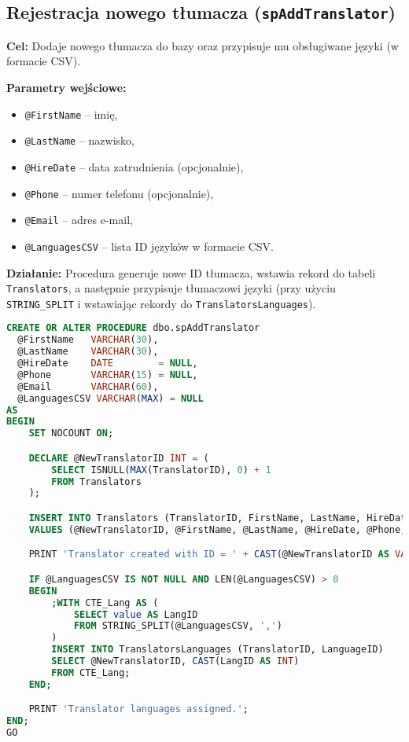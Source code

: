 \documentclass[12pt]{article}
\begin{document}
\newpage
\subsection{Rejestracja nowego tłumacza (\texttt{spAddTranslator})}
\textbf{Cel:} Dodaje nowego tłumacza do bazy oraz przypisuje mu obsługiwane języki (w formacie CSV).

\textbf{Parametry wejściowe:}
\begin{itemize}
  \item \verb|@FirstName| – imię,
  \item \verb|@LastName| – nazwisko,
  \item \verb|@HireDate| – data zatrudnienia (opcjonalnie),
  \item \verb|@Phone| – numer telefonu (opcjonalnie),
  \item \verb|@Email| – adres e-mail,
  \item \verb|@LanguagesCSV| – lista ID języków w formacie CSV.
\end{itemize}

\textbf{Działanie:} Procedura generuje nowe ID tłumacza, wstawia rekord do tabeli \verb|Translators|, a następnie przypisuje tłumaczowi języki (przy użyciu \verb|STRING_SPLIT| i wstawiając rekordy do \verb|TranslatorsLanguages|).

\begin{lstlisting}[language=SQL]
CREATE OR ALTER PROCEDURE dbo.spAddTranslator
  @FirstName   VARCHAR(30),
  @LastName    VARCHAR(30),
  @HireDate    DATE        = NULL,
  @Phone       VARCHAR(15) = NULL,
  @Email       VARCHAR(60),
  @LanguagesCSV VARCHAR(MAX) = NULL
AS
BEGIN
    SET NOCOUNT ON;

    DECLARE @NewTranslatorID INT = (
        SELECT ISNULL(MAX(TranslatorID), 0) + 1
        FROM Translators
    );

    INSERT INTO Translators (TranslatorID, FirstName, LastName, HireDate, Phone, Email)
    VALUES (@NewTranslatorID, @FirstName, @LastName, @HireDate, @Phone, @Email);

    PRINT 'Translator created with ID = ' + CAST(@NewTranslatorID AS VARCHAR(10));

    IF @LanguagesCSV IS NOT NULL AND LEN(@LanguagesCSV) > 0
    BEGIN
        ;WITH CTE_Lang AS (
            SELECT value AS LangID
            FROM STRING_SPLIT(@LanguagesCSV, ',')
        )
        INSERT INTO TranslatorsLanguages (TranslatorID, LanguageID)
        SELECT @NewTranslatorID, CAST(LangID AS INT)
        FROM CTE_Lang;
    END;

    PRINT 'Translator languages assigned.';
END;
GO
\end{lstlisting}
\end{document}
